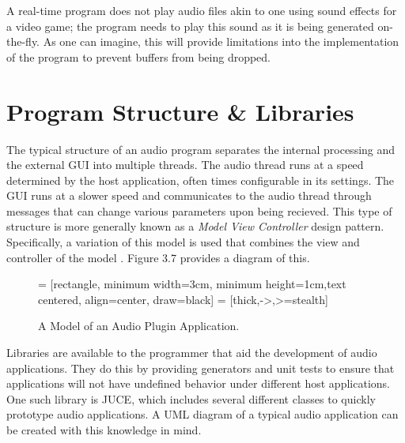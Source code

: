 A real-time program does not play audio files akin to one using sound effects for a video game; the program needs to play this sound as it is being generated on-the-fly. As one can imagine, this will provide limitations into the implementation of the program to prevent buffers from being dropped.


\section{Program Structure \& Libraries}
The typical structure of an audio program separates the internal processing and the external GUI into multiple threads. The audio thread runs at a speed determined by the host application, often times configurable in its settings. The GUI runs at a slower speed and communicates to the audio thread through messages that can change various parameters upon being recieved. This type of structure is more generally known as a \textit{Model View Controller} design pattern. Specifically, a variation of this model is used that combines the view and controller of the model \cite{Bucanek2009}. Figure 3.7 provides a diagram of this.

\begin{figure}[h] %
	 = [rectangle, minimum width=3cm, minimum height=1cm,text centered, align=center, draw=black]
	 = [thick,->,>=stealth]
	\begin{center}
		\caption{A Model of an Audio Plugin Application.}
	\end{center}
\end{figure}

Libraries are available to the programmer that aid the development of audio applications. They do this by providing generators and unit tests to ensure that applications will not have undefined behavior under different host applications. One such library is JUCE, which includes several different classes to quickly prototype audio applications. A UML diagram of a typical audio application can be created with this knowledge in mind.

